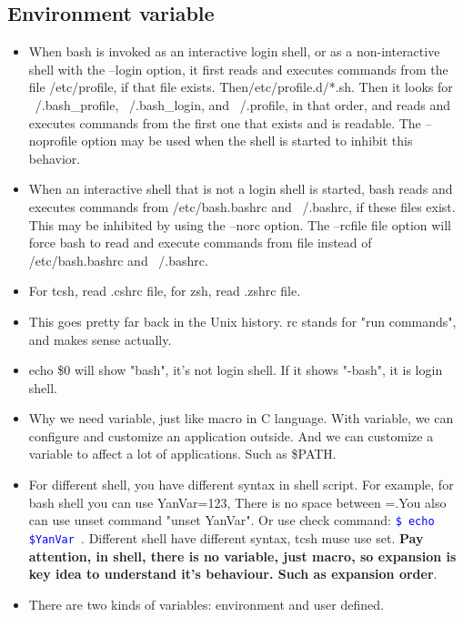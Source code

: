 \documentclass[a4paper,11pt,twoside]{book}
\newcommand{\linuxcommand}[1]{\texttt{\textcolor{blue}{\$ #1 \Pisymbol{psy}{191}}}}
\begin{document}
\subsection{Environment variable}
\begin{itemize} 
		\item When bash is invoked as an interactive login shell, or as a non-interactive shell with the --login option, it first reads and executes commands from the file /etc/profile, if that file exists. Then/etc/profile.d/*.sh. Then it looks for ~/.bash\_profile,  ~/.bash\_login, and ~/.profile, in that order, and reads and executes commands from the first one that exists and is readable. The --noprofile option may be used when the shell is started to inhibit this behavior.
		
		\item When an interactive shell that is not a login shell is started, bash reads and executes commands from  /etc/bash.bashrc and ~/.bashrc, if these files exist. This may be inhibited by using the --norc option. The --rcfile file option will force bash to read and execute commands from file instead of /etc/bash.bashrc and  ~/.bashrc.	

		\item For tcsh, read .cshrc file, for zsh, read .zshrc file.

		\item This goes pretty far back in the Unix history. rc stands for "run commands", and makes sense actually.

		\item echo \$0 will show "bash", it's not login shell. If it shows "-bash", it is login shell.  
	
		\item Why we need variable, just like macro in C language. With variable, we can configure and customize an application outside. And we can customize a variable to affect a lot of applications. Such as \$PATH.
				
		\item For different shell, you have different syntax in shell script. For example, for bash shell you can use YanVar=123, There is no space between =.You also can use unset command "unset YanVar". Or use check command: \linuxcommand{echo \$YanVar}. Different shell have different syntax, tcsh muse use set. \textbf{Pay attention, in shell, there is no variable, just macro, so expansion is key idea to understand it's behaviour. Such as expansion order}.

		\item There are two kinds of variables: environment and user defined.


\end{itemize}
\end{document}
